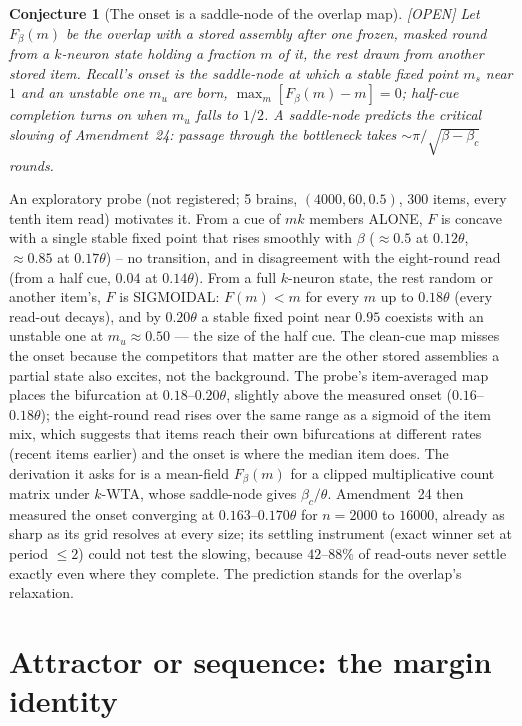 \documentclass[11pt]{article}
\theoremstyle{definition}
\theoremstyle{plain}
\newtheorem{conjecture}[lemma]{Conjecture}
\newcommand{\OPEN}{\textnormal{\footnotesize\textsf{[OPEN]}}}
\begin{document}
\begin{conjecture}[The onset is a saddle-node of the overlap map]\label{conj:saddle} \OPEN
Let $F_\beta(m)$ be the overlap with a stored assembly after one frozen,
masked round from a $k$-neuron state holding a fraction $m$ of it, the rest
drawn from another stored item. Recall's onset is the saddle-node at which a
stable fixed point $m_s$ near $1$ and an unstable one $m_u$ are born,
$\max_m [F_\beta(m) - m] = 0$; half-cue completion turns on when $m_u$ falls to
$1/2$. A saddle-node predicts the critical slowing of
Amendment~24: passage through the bottleneck takes $\sim \pi/\sqrt{\beta - \beta_c}$
rounds.
\end{conjecture}

An exploratory probe (not registered; 5 brains, $(4000, 60, 0.5)$, 300 items,
every tenth item read) motivates it. From a cue of $mk$ members ALONE, $F$ is
concave with a single stable fixed point that rises smoothly with $\beta$
($\approx 0.5$ at $0.12\theta$, $\approx 0.85$ at $0.17\theta$) -- no transition,
and in disagreement with the eight-round read (from a half cue, $0.04$ at
$0.14\theta$). From a full $k$-neuron state, the rest random or another item's,
$F$ is SIGMOIDAL: $F(m) < m$ for every $m$ up to $0.18\theta$ (every read-out
decays), and by $0.20\theta$ a stable fixed point near $0.95$ coexists with an
unstable one at $m_u \approx 0.50$ --- the size of the half cue. The clean-cue
map misses the onset because the competitors that matter are the other stored
assemblies a partial state also excites, not the background. The probe's
item-averaged map places the bifurcation at $0.18$--$0.20\theta$, slightly
above the measured onset ($0.16$--$0.18\theta$); the eight-round read rises over
the same range as a sigmoid of the item mix, which suggests that items reach
their own bifurcations at different rates (recent items earlier) and the
onset is where the median item does. The derivation it asks for is a
mean-field $F_\beta(m)$ for a clipped multiplicative count matrix under
$k$-WTA, whose saddle-node gives $\beta_c/\theta$.
Amendment~24 then measured the onset converging at $0.163$--$0.170\theta$ for
$n = 2000$ to $16000$, already as sharp as its grid resolves at every size;
its settling instrument (exact winner set at period $\le 2$) could not test
the slowing, because $42$--$88\%$ of read-outs never settle exactly even
where they complete. The prediction stands for the overlap's relaxation.

\section{Attractor or sequence: the margin identity}
\end{document}
